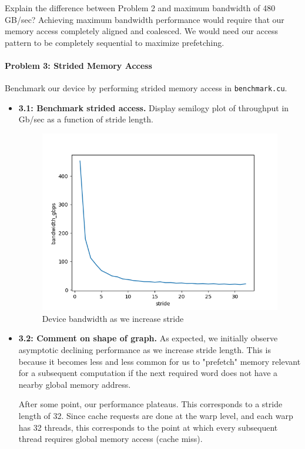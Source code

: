 \documentclass[12pt,letterpaper,twoside]{article}
\begin{document}
\begin{itemize}
    Explain the difference between Problem 2 and maximum bandwidth of 480 GB/sec? 
    Achieving maximum bandwidth performance would require that our memory access
    completely aligned and coalesced. We would need our access pattern to 
    be completely sequential to maximize prefetching.

\end{itemize}


\paragraph{Problem 3: Strided Memory Access} Benchmark our device by performing
strided memory access in \texttt{benchmark.cu}.

\begin{itemize}
    \item \textbf{3.1: Benchmark strided access.} Display semilogy plot of 
    throughput in Gb/sec as a function of stride length. 

    \begin{figure}[h]
        \center
        \includegraphics[scale=0.7]{q3_1.png}
        \caption{Device bandwidth as we increase stride}
    \end{figure}

    \item \textbf{3.2: Comment on shape of graph.} As expected, we 
    initially observe asymptotic declining performance as we increase 
    stride length. This is because it becomes less and less common for 
    us to "prefetch" memory relevant for a subsequent computation if 
    the next required word does not have a nearby global memory address.

    After some point, our performance plateaus. This corresponds to a stride
    length of 32. Since cache requests are done at the warp level, and each 
    warp has 32 threads, this corresponds to the point at which every 
    subsequent thread requires global memory access (cache miss).

\end{itemize}
\end{document}
